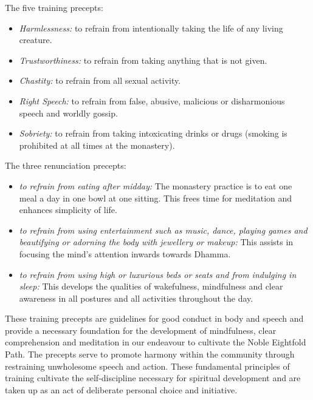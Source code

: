 The five training precepts:

\begin{itemize}

  \item \emph{Harmlessness:} to refrain from intentionally taking the life of
    any living creature.

  \item \emph{Trustworthiness:} to refrain from taking anything that is not
    given.

  \item \emph{Chastity:} to refrain from all sexual activity.

  \item \emph{Right Speech:} to refrain from false, abusive, malicious or
    disharmonious speech and worldly gossip.

  \item \emph{Sobriety:} to refrain from taking intoxicating drinks or drugs
    (smoking is prohibited at all times at the monastery).
\end{itemize}

The three renunciation precepts:

\begin{itemize}

  \item \emph{to refrain from eating after midday:} The monastery practice is
    to eat one meal a day in one bowl at one sitting. This frees time
    for meditation and enhances simplicity of life.

  \item \emph{to refrain from using entertainment such as music, dance,
    playing games and beautifying or adorning the body with jewellery or
  makeup:} This assists in focusing the mind's attention inwards towards
  Dhamma.

  \item \emph{to refrain from using high or luxurious beds or seats and from
    indulging in sleep:} This develops the qualities of wakefulness,
    mindfulness and clear awareness in all postures and all activities
    throughout the day.

\end{itemize}

These training precepts are guidelines for good conduct in body and
speech and provide a necessary foundation for the development of
mindfulness, clear comprehension and meditation in our endeavour to
cultivate the Noble Eightfold Path. The precepts serve to promote
harmony within the community through restraining unwholesome speech and
action. These fundamental principles of training cultivate the
self-discipline necessary for spiritual development and are taken up as
an act of deliberate personal choice and initiative.

